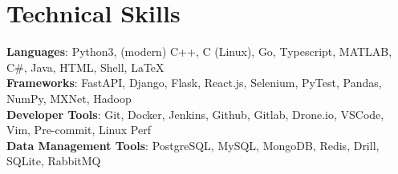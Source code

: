 \documentclass[letterpaper,11pt]{article}
\begin{document}
\section{Technical Skills}
 \begin{itemize}[leftmargin=0.15in, label={}]
    \small{\item{
     \textbf{Languages}{: Python3, (modern) C++, C (Linux), Go, Typescript, MATLAB, C\#, Java, HTML, Shell, \LaTeX} \\
     \textbf{Frameworks}{: FastAPI, Django, Flask, React.js, Selenium, PyTest, Pandas, NumPy, MXNet, Hadoop} \\
     \textbf{Developer Tools}{: Git, Docker, Jenkins, Github, Gitlab, Drone.io, VSCode, Vim, Pre-commit, Linux Perf} \\
     \textbf{Data Management Tools}{: PostgreSQL, MySQL, MongoDB, Redis, Drill, SQLite, RabbitMQ} \\
    }}
 \end{itemize}


\end{document}
